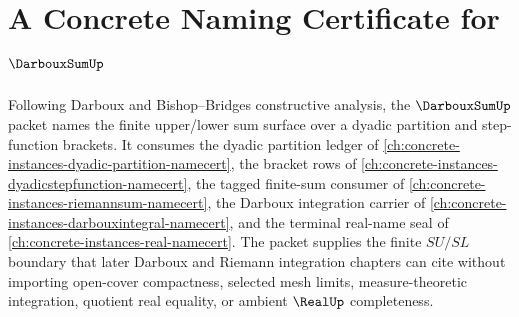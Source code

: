 \chapter{A Concrete Naming Certificate for $\DarbouxSumUp$}
\label{ch:concrete-instances-darboux-sum-namecert}

Following Darboux and Bishop--Bridges constructive analysis, the $\DarbouxSumUp$ packet names the finite upper/lower sum surface over a dyadic partition and step-function brackets. It consumes the dyadic partition ledger of \autoref{ch:concrete-instances-dyadic-partition-namecert}, the bracket rows of \autoref{ch:concrete-instances-dyadicstepfunction-namecert}, the tagged finite-sum consumer of \autoref{ch:concrete-instances-riemannsum-namecert}, the Darboux integration carrier of \autoref{ch:concrete-instances-darbouxintegral-namecert}, and the terminal real-name seal of \autoref{ch:concrete-instances-real-namecert}. The packet supplies the finite $SU/SL$ boundary that later Darboux and Riemann integration chapters can cite without importing open-cover compactness, selected mesh limits, measure-theoretic integration, quotient real equality, or ambient $\RealUp$ completeness.

